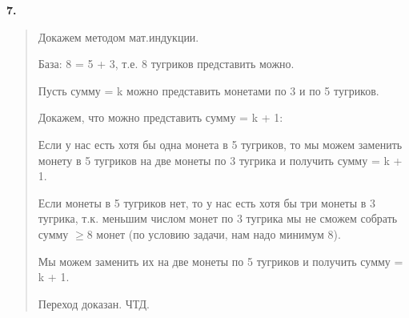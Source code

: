 \documentclass{article}
\begin{document}
\textbf{\textsf{7.}}
\begin{quote}
    Докажем методом мат.индукции.

    База: 8 = 5 + 3, т.е. 8 тугриков представить можно.
    
    Пусть сумму = k можно представить монетами по 3 и по 5 тугриков.
    
    Докажем, что можно представить сумму = k + 1:

    
    Если у нас есть хотя бы одна монета в 5 тугриков, то мы можем заменить монету в 5 тугриков на две монеты по 3 тугрика и получить сумму = k + 1.

    Если монеты в 5 тугриков нет, то у нас есть хотя бы три монеты в 3 тугрика, т.к. меньшим числом монет по 3 тугрика мы не сможем собрать сумму $\geq 8$ монет (по условию задачи, нам надо минимум 8). 
    
    
    Мы можем заменить их на две монеты по 5 тугриков и получить сумму = k + 1.

    Переход доказан. ЧТД.

\end{quote}
\end{document}
